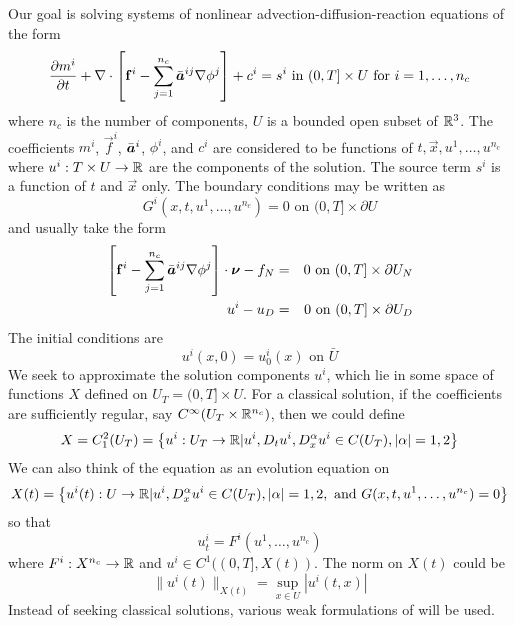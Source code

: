 \documentclass[10pt,dvips,twoside,reqno]{amsart}
\begin{document}
Our goal is solving systems of nonlinear advection-diffusion-reaction
equations of the form
\begin{equation}
  \label{eq:nladrsys}
  \frac{\partial {m^i}}{\partial {t}} + \nabla \cdot \left[ {\bf f}^i - \sum_{j=1}^{n_c} \bar{\mbox{{\boldmath ${a}$}}}^{ij} \nabla \phi^j \right] + c^i = s^i \mbox{ in } (0,T] \times U \mbox{ for } i=1,\ldots, n_c
\end{equation}
where $n_c$ is the number of components, $U$ is a bounded open
subset of $\mathbb{R}^3$. The coefficients $m^i$, $\vec f^i$, $\bar{\mbox{{\boldmath ${a}$}}}^i$, $\phi^i$, and $c^i$
are considered to be functions of $t, \vec x, u^1, \ldots, u^{n_c}$
where $u^i: T \times U \rightarrow \mathbb{R}$ are the components of the
solution. The source term $s^i$ is a function of $t$ and $\vec x$
only. The boundary conditions may be written as
\begin{equation}
  \label{eq:bc}
  G^i(x,t,u^1,\dots,u^{n_c}) = 0 \mbox{ on } (0,T] \times \partial U 
\end{equation}
and usually take the form
\begin{eqnarray}
\left[ {\bf f}^i - \sum_{j=1}^{n_c} \bar{\mbox{{\boldmath ${a}$}}}^{ij} \nabla \phi^j \right] \cdot \mbox{{\boldmath ${\nu}$}} - f_N &=& 0\mbox{ on } (0,T] \times \partial U_N \\
u^i - u_D &=& 0 \mbox{ on } (0,T] \times \partial U_D
\end{eqnarray}
The initial conditions are
\begin{equation}
  \label{eq:ic}
  u^i(x,0) = u^i_0(x) \mbox{ on } \bar{U}
\end{equation}
We seek to approximate the solution components $u^i$, which lie in
some space of functions $X$ defined on $U_T = (0,T] \times
U$. For a classical solution, if the coefficients are sufficiently
regular, say $C^{\infty}(U_T \times \mathbb{R}^{n_c})$, then we could
define
\begin{equation}
X = C^2_1(U_T) = \left\{ u^i: U_T \rightarrow \mathbb{R} | u^i, D_t u^i, D^{\alpha}_x u^i \in C(U_T), |\alpha| =1,2 \right\}  
\end{equation}
We can also think of the equation as an evolution equation on
\begin{equation}
X(t) = \left\{ u^i(t) : U \rightarrow \mathbb{R} | u^i, D^{\alpha}_x u^i \in C(U_T), |\alpha| = 1,2, \mbox { and } G(x,t,u^1,\ldots,u^{n_c}) = 0 \right\}  
\end{equation}
so that
\begin{equation}
  \label{eq:classicalEvolution}
  u^i_t = F^i(u^1,\ldots,u^{n_c}) 
\end{equation}
where $F^i: X^{n_c} \rightarrow \mathbb{R}$ and $u^i \in C^1((0,T],X(t))$. The norm on $X(t)$ could be
\begin{equation}
\|u^i(t)\|_{X(t)} = \sup_{x \in U} |u^i(t,x)|
\end{equation}
Instead of seeking classical solutions, various weak formulations of
 will be used. 
\end{document}
